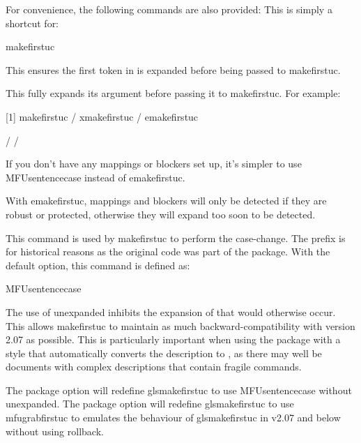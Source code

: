 \documentclass[titlepage=false,oneside,
 fontsize=12pt,captions=tableheading]{scrbook}
\begin{document}
For convenience, the following commands are also provided:
This is simply a shortcut for:
\begin{compactcodebox}
\gls{makefirstuc}
\end{compactcodebox}
This ensures the first token in  is expanded before being
passed to \gls{makefirstuc}.

This fully expands its argument before passing it to
\gls{makefirstuc}. For example:
\begin{codebox}
[1]
\gls{makefirstuc} /
\gls{xmakefirstuc} /
\gls{emakefirstuc}
\end{codebox}
\begin{resultbox}
\newcommand{\test}[1]{sample #1}
\newcommand{\tmp}{\test{text}}
\makefirstuc{\tmp} /
\xmakefirstuc{\tmp} /
\emakefirstuc{\tmp}
\end{resultbox}
If you don't have any mappings or blockers set up, it's simpler to
use \gls{MFUsentencecase} instead of \gls{emakefirstuc}.

\begin{important}
With \gls{emakefirstuc}, mappings and blockers will only be
detected if they are robust or protected, otherwise they will expand too soon to
be detected.
\end{important}

This command is used by \gls{makefirstuc} to perform the
case-change. The  prefix is for historical reasons as the original code
was part of the  package. With the default
 option, this command is defined as:
\begin{compactcodebox}
\gls{MFUsentencecase}
\end{compactcodebox}
The use of \gls{unexpanded} inhibits the expansion of 
that would otherwise occur. This allows \gls{makefirstuc} to
maintain as much backward-compatibility with version 2.07 as
possible. This is particularly important when using the
 package with a style that automatically converts
the description to , as there may well be
documents with complex descriptions that contain fragile commands.

The  package option will redefine \gls{glsmakefirstuc}
to use \gls{MFUsentencecase} without \gls{unexpanded}. The
 package option will redefine \gls{glsmakefirstuc}
to use \gls{mfugrabfirstuc} to emulates the behaviour of
\gls{glsmakefirstuc} in v2.07 and below without using rollback.
\end{document}
